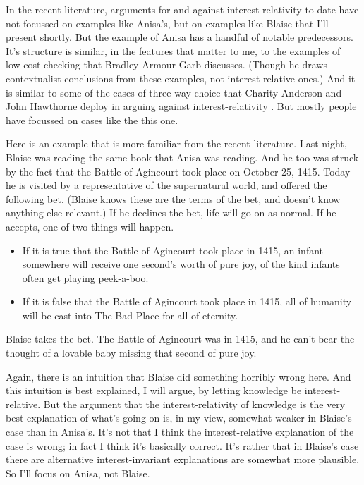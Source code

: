 \documentclass[
  11pt,
]{book}
\providecommand{\tightlist}{%
  \setlength{\itemsep}{0pt}\setlength{\parskip}{0pt}}
\begin{document}
In the recent literature, arguments for and against interest-relativity to date have not focussed on examples like Anisa's, but on examples like Blaise that I'll present shortly. But the example of Anisa has a handful of notable predecessors. It's structure is similar, in the features that matter to me, to the examples of low-cost checking that Bradley Armour-Garb \citeyearpar{ArmourGarb2011} discusses. (Though he draws contextualist conclusions from these examples, not interest-relative ones.) And it is similar to some of the cases of three-way choice that Charity Anderson and John Hawthorne deploy in arguing against interest-relativity \citetext{\citeyear{AndersonHawthorne2019a}; \citeyear{AndersonHawthorne2019b}}. But mostly people have focussed on cases like the this one.

Here is an example that is more familiar from the recent literature. Last night, Blaise was reading the same book that Anisa was reading. And he too was struck by the fact that the Battle of Agincourt took place on October 25, 1415. Today he is visited by a representative of the supernatural world, and offered the following bet. (Blaise knows these are the terms of the bet, and doesn't know anything else relevant.) If he declines the bet, life will go on as normal. If he accepts, one of two things will happen.

\begin{itemize}
\tightlist
\item
  If it is true that the Battle of Agincourt took place in 1415, an infant somewhere will receive one second's worth of pure joy, of the kind infants often get playing peek-a-boo.
\item
  If it is false that the Battle of Agincourt took place in 1415, all of humanity will be cast into The Bad Place for all of eternity.
\end{itemize}

Blaise takes the bet. The Battle of Agincourt was in 1415, and he can't bear the thought of a lovable baby missing that second of pure joy.

Again, there is an intuition that Blaise did something horribly wrong here. And this intuition is best explained, I will argue, by letting knowledge be interest-relative. But the argument that the interest-relativity of knowledge is the very best explanation of what's going on is, in my view, somewhat weaker in Blaise's case than in Anisa's. It's not that I think the interest-relative explanation of the case is wrong; in fact I think it's basically correct. It's rather that in Blaise's case there are alternative interest-invariant explanations are somewhat more plausible. So I'll focus on Anisa, not Blaise.
\end{document}

